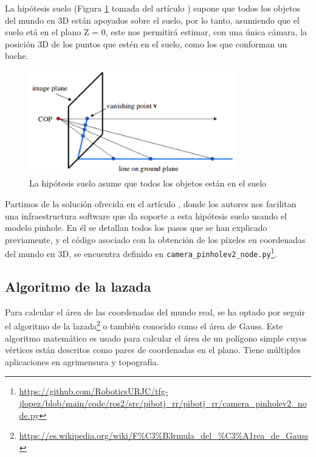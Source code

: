 
La hipótesis suelo (Figura \ref{fig:hipotesissuelo} tomada del artículo \cite{vega19d}) supone que todos los objetos del mundo en 3D están apoyados sobre el suelo, por lo tanto, asumiendo que el suelo etá en el plano Z = 0, este nos permitirá estimar, con una única cámara, la posición 3D de los puntos que estén en el suelo, como los que conforman un bache.

 \begin{figure} [h!]
	\begin{center}
		\includegraphics[width=9cm]{figs/cap6/hipotesissuelo.png}
	\end{center}
	\caption{La hipótesis suelo asume que todos los objetos están en el suelo}
	\label{fig:hipotesissuelo}
\end{figure}


Partimos de la solución ofrecida en el artículo \cite{vega19d}, donde los autores nos facilitan una infraestructura software que da soporte a esta hipótesis suelo usando el modelo pinhole. En él se detallan todos los pasos que se han explicado previamente, y el código asociado con la obtención de los píxeles en coordenadas del mundo en 3D, se encuentra definido en \verb|camera_pinholev2_node.py|\footnote{\url{https://github.com/RoboticsURJC/tfg-jlopez/blob/main/code/ros2/src/pibotj_rr/pibotj_rr/camera_pinholev2_node.py}}.

\subsection{Algoritmo de la lazada}
\label{subsec:softwareshoelace}

Para calcular el área de las coordenadas del mundo real, se ha optado por seguir el algoritmo de la lazada\footnote{\url{https://es.wikipedia.org/wiki/F\%C3\%B3rmula_del_\%C3\%A1rea_de_Gauss}} o también conocido como el área de Gauss. Este algoritmo matemático es usado para calcular el área de un polígono simple cuyos vértices están descritos como pares de coordenadas en el plano. Tiene múltiples aplicaciones en agrimensura y topografía.

